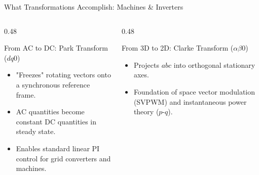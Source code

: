 \begin{frame}{What Transformations Accomplish: Machines \& Inverters}
    \begin{columns}
        \begin{column}{0.48\textwidth}
            \begin{block}{From AC to DC: Park Transform ($dq0$)}
                \begin{itemize}
                    \item "Freezes" rotating vectors onto a synchronous reference frame.
                    \item AC quantities become constant DC quantities in steady state.
                    \item Enables standard linear PI control for grid converters and machines.
                \end{itemize}
            \end{block}
        \end{column}
        \begin{column}{0.48\textwidth}
            \begin{block}{From 3D to 2D: Clarke Transform ($\alpha\beta0$)}
                \begin{itemize}
                    \item Projects $abc$ into orthogonal stationary axes.
                    \item Foundation of space vector modulation (SVPWM) and instantaneous power theory ($p\text{-}q$).
                \end{itemize}
            \end{block}
        \end{column}
    \end{columns}
\end{frame}

